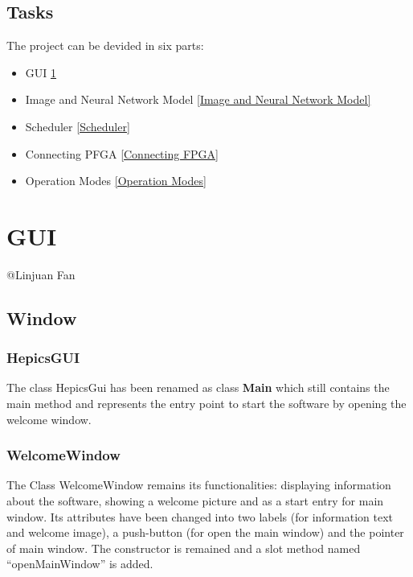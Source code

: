 \documentclass[parskip=full]{scrartcl}
\newcommand\tab[1][1cm]{\hspace*{#1}}
\begin{document}
	\subsection{Tasks}
	\tab The project can be devided in six parts:
	\tab \begin{itemize}
	\item GUI \ref{GUI}
	\item Image and Neural Network Model  \ref{Image and Neural Network Model}
	\item Scheduler \ref{Scheduler}
	\item Connecting PFGA \ref{Connecting FPGA}
	\item Operation Modes  \ref{Operation Modes}
	\end{itemize}
	
\pagebreak
	
\section{GUI} \label{GUI}
	@Linjuan Fan 
	\subsection{Window}
	\subsubsection{HepicsGUI}
	    \tab The class HepicsGui has been renamed as class \textbf{Main} which still contains the main method and represents the entry point to start the software by opening the welcome window.


    \subsubsection{WelcomeWindow}
        \tab The Class WelcomeWindow remains its functionalities: displaying information about the software, showing a welcome picture and as a start entry for main window. 
        Its attributes have been changed into two labels (for information text and welcome image), a push-button (for open the main window) and the pointer of main window. 
        The constructor is remained and a slot method named “openMainWindow” is added.
        
\end{document}
